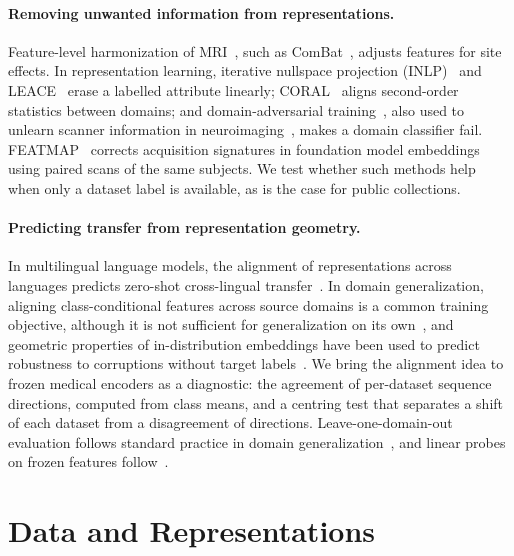 \documentclass[11pt]{article}
\begin{document}
\paragraph{Removing unwanted information from representations.}
Feature-level harmonization of MRI~\cite{yang_harmonization_2025}, such as
ComBat~\cite{johnson_adjusting_2007, fortin_harmonization_2018}, adjusts
features for site effects. In representation learning, iterative nullspace
projection (INLP)~\cite{ravfogel_null_2020} and LEACE~\cite{belrose_leace_2023}
erase a labelled attribute linearly; CORAL~\cite{sun_deep_2016} aligns
second-order statistics between domains; and domain-adversarial
training~\cite{ganin_domain-adversarial_2016}, also used to unlearn scanner
information in neuroimaging~\cite{dinsdale_deep_2021}, makes a domain
classifier fail. FEATMAP~\cite{donle_featmap_2026} corrects acquisition
signatures in foundation model embeddings using paired scans of the same
subjects. We test whether such methods help when only a dataset label is
available, as is the case for public collections.

\paragraph{Predicting transfer from representation geometry.}
In multilingual language models, the alignment of representations across
languages predicts zero-shot cross-lingual transfer~\cite{muller_first_2021,
deshpande_when_2022}. In domain generalization, aligning class-conditional
features across source domains is a common training objective, although it
is not sufficient for generalization on its own~\cite{mahajan_domain_2021},
and geometric properties of in-distribution embeddings have been used to
predict robustness to corruptions without target
labels~\cite{zia_representation_2026}. We bring the alignment idea to frozen
medical encoders as a diagnostic: the agreement of per-dataset sequence
directions, computed from class means, and a centring test that separates a
shift of each dataset from a disagreement of directions. Leave-one-domain-out
evaluation follows standard practice in domain
generalization~\cite{gulrajani_search_2021}, and linear probes on frozen
features follow~\cite{alain_understanding_2017}.

\section{Data and Representations}
\label{sec:data}
\end{document}
